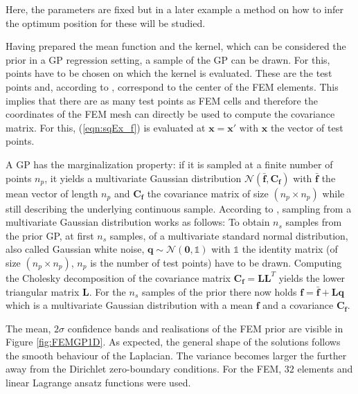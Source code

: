 \documentclass[%
  a4paper,oneside,%
  11pt,%
  smallchapters,
  style=printdev,
  extramargin,
  green,%
  rgb, <cmyk>
  ]{tubsbook}
\begin{document}
%
Here, the parameters are fixed but in a later example a method on how to infer the optimum position for these will be studied.

Having prepared the mean function and the kernel, which can be considered the prior in a GP regression setting, a sample of the GP can be drawn. For this, points have to be chosen on which the kernel is evaluated. These are the test points and, according to \cite{girolami2021}, correspond to the center of the FEM elements. This implies that there are as many test points as FEM cells and therefore the coordinates of the FEM mesh can directly be used to compute the covariance matrix. For this, (\ref{eqn:sqEx_f}) is evaluated at $\bm{x} = \bm{x}'$ with $\bm{x}$ the vector of test points. 

A GP has the marginalization property: if it is sampled at a finite number of points $n_p$, it yields a multivariate Gaussian distribution $\mathcal{N}(\bar{\bm{f}},\bm{C_f})$ with $\bar{\bm{f}}$ the mean vector of length $n_p$ and $\bm{C_f}$ the covariance matrix of size $(n_p \times n_p)$ while still describing the underlying continuous sample.
According to \cite[p. 201]{rasmussen2006}, sampling from a multivariate Gaussian distribution works as follows: To obtain $n_s$ samples from the prior GP, at first $n_s$ samples, of a multivariate standard normal distribution, also called Gaussian white noise, $\bm{q} \sim \mathcal{N}(\bm{0},\mathbb{1})$ with $\mathbb{1}$ the identity matrix (of size $(n_p \times n_p)$, $n_p$ is the number of test points) have to be drawn. Computing the Cholesky decomposition of the covariance matrix $\bm{C_f} = \bm{L}\bm{L}^T$ yields the lower triangular matrix $\bm{L}$. For the $n_s$ samples of the prior there now holds $\bm{f} = \bar{\bm{f}} + \bm{L}\bm{q}$ which is a multivariate Gaussian distribution with a mean $\bm{f}$ and a covariance $\bm{C_f}$.

The mean, $2\sigma$ confidence bands and realisations of the FEM prior are visible in Figure \ref{fig:FEMGP1D}. As expected, the general shape of the solutions follows the smooth behaviour of the Laplacian. The variance becomes larger the further away from the Dirichlet zero-boundary conditions. For the FEM, $32$ elements and linear Lagrange ansatz functions were used.
\end{document}
